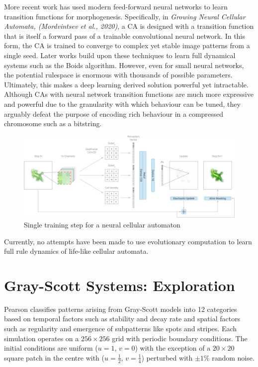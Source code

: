 More recent work has used modern feed-forward neural networks to learn transition functions for morphogenesis. Specifically, in \textit{Growing Neural Cellular Automata, (Mordvintsev et al., 2020)}\cite{mordvintsev2020growing}, a CA is designed with a transition function that is itself a forward pass of a trainable convolutional neural network. In this form, the CA is trained to converge to complex yet stable image patterns from a single seed. Later works build upon these techniques to learn full dynamical systems such as the Boids algorithm\cite{grattarola2021learning}. However, even for small neural networks, the potential rulespace is enormous with thousands of possible parameters. Ultimately, this makes a deep learning derived solution powerful yet intractable. Although CAs with neural network transition functions are much more expressive and powerful due to the granularity with which behaviour can be tuned, they arguably defeat the purpose of encoding rich behaviour in a compressed chromosome such as a bitstring.\\

\begin{figure}[!h]
\centering
\includegraphics[width=\textwidth]{images/nca.png}
\caption{Single training step for a neural cellular automaton\cite{mordvintsev2020growing}}
\label{fig:nca}
\end{figure}

Currently, no attempts have been made to use evolutionary computation to learn full rule dynamics of life-like cellular automata.

\section{Gray-Scott Systems: Exploration}

Pearson\cite{pearson1993complex} classifies patterns arising from Gray-Scott models into 12 categories based on temporal factors such as stability and decay rate and spatial factors such as regularity and emergence of subpatterns like spots and stripes. Each simulation operates on a $256 \times 256$ grid with periodic boundary conditions. The initial conditions are uniform ($u = 1$, $v = 0$) with the exception of a $20 \times 20$ square patch in the centre with ($u=\frac{1}{2}$, $v=\frac{1}{4}$) perturbed with $\pm 1\%$ random noise.\\

